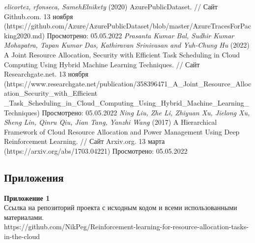 \documentclass[draft]{article}
\newcommand\zz[1]{\par{\normalsize\strut #1} \hfill\ignorespaces}
\begin{document}
\begin{center}
\begin{thebibliography}{}
 \textit{elicortez, rfonseca, SamehElnikety} (2020) AzurePublicDataset. // Сайт Github.com. 13 ноября (https://github.com/Azure/AzurePublicDataset/blob/master/AzureTracesForPacking2020.md) Просмотрено: 05.05.2022
 \textit{Prasanta Kumar Bal, Sudhir Kumar Mohapatra, Tapan Kumar Das, Kathiravan Srinivasan and Yuh-Chung Hu} (2022) A Joint Resource Allocation, Security with Efficient Task Scheduling in Cloud Computing Using Hybrid Machine Learning Techniques. // Сайт Researchgate.net. 13 ноября (https://www.researchgate.net/publication/358396471\_A\_Joint\_Resource\_Allocation\_Security\_with\_Efficient\\\_Task\_Scheduling\_in\_Cloud\_Computing\_Using\_Hybrid\_Machine\_Learning\_Techniques) Просмотрено: 05.05.2022
 \textit{Ning Liu, Zhe Li, Zhiyuan Xu, Jielong Xu, Sheng Lin, Qinru Qiu, Jian Tang, Yanzhi Wang} (2017) A Hierarchical Framework of Cloud Resource Allocation and Power Management Using Deep Reinforcement Learning. // Сайт Arxiv.org. 13 марта (https://arxiv.org/abs/1703.04221) Просмотрено: 05.05.2022
\end{thebibliography}
\end{center}
\newpage
\begin{center}
\section {Приложения}
\end{center}
\zz{}\textbf{Приложение 1\\}
Ссылка на репозиторий проекта с исходным кодом и всеми использованными материалами.\\
https://github.com/NikPeg/Reinforcement-learning-for-resource-allocation-tasks-in-the-cloud\\
\end{document}
